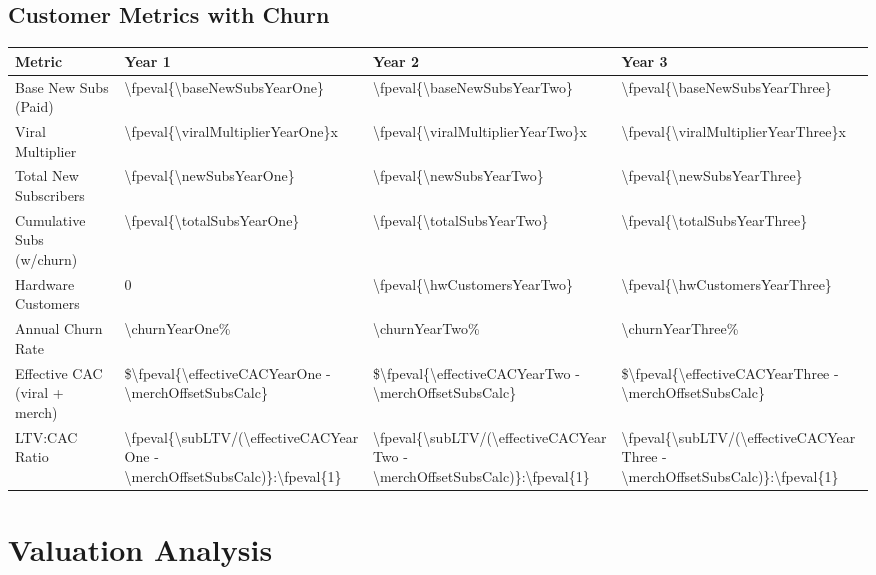 \documentclass[11pt]{article}
\newcommand{\numfpeval}[1]{\num{\fpeval{#1}}}
\newcommand{\numint}[1]{\num[round-precision=0]{\fpeval{#1}}}
\begin{document}
\subsection{Customer Metrics with Churn}
\begin{table}[H]
\centering
\begin{tabularx}{\linewidth}{l Y Y Y}
\toprule
Metric & Year 1 & Year 2 & Year 3 \\\midrule
Base New Subs (Paid) & \numint{\baseNewSubsYearOne} & \numint{\baseNewSubsYearTwo} & \numint{\baseNewSubsYearThree} \\
Viral Multiplier & \numfpeval{\viralMultiplierYearOne}x & \numfpeval{\viralMultiplierYearTwo}x & \numfpeval{\viralMultiplierYearThree}x \\
Total New Subscribers & \numint{\newSubsYearOne} & \numint{\newSubsYearTwo} & \numint{\newSubsYearThree} \\
Cumulative Subs (w/churn) & \numint{\totalSubsYearOne} & \numint{\totalSubsYearTwo} & \numint{\totalSubsYearThree} \\
Hardware Customers & \num{0} & \numint{\hwCustomersYearTwo} & \numint{\hwCustomersYearThree} \\
Annual Churn Rate\cite{recurly2024} & \num{\churnYearOne}\% & \num{\churnYearTwo}\% & \num{\churnYearThree}\% \\
Effective CAC (viral + merch) & \$\numint{\effectiveCACYearOne - \merchOffsetSubsCalc} & \$\numint{\effectiveCACYearTwo - \merchOffsetSubsCalc} & \$\numint{\effectiveCACYearThree - \merchOffsetSubsCalc} \\
LTV:CAC Ratio & \numint{\subLTV/(\effectiveCACYearOne - \merchOffsetSubsCalc)}:\numint{1} & \numint{\subLTV/(\effectiveCACYearTwo - \merchOffsetSubsCalc)}:\numint{1} & \numint{\subLTV/(\effectiveCACYearThree - \merchOffsetSubsCalc)}:\numint{1} \\
\bottomrule
\end{tabularx}
\end{table}

\section{Valuation Analysis}
\end{document}
